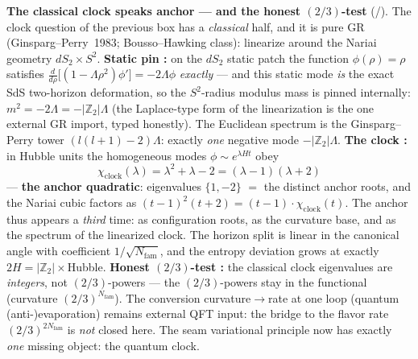 \documentclass[11pt,a4paper]{article}
\newcommand{\Z}{\mathbb{Z}}
\newcommand{\Nfam}{N_{\mathrm{fam}}}
\begin{document}
\par\smallskip\noindent\textbf{The classical clock speaks anchor --- and the honest $(2/3)$-test} (\mE/\mC).
The clock question of the previous box has a \emph{classical} half, and it is pure GR
(Ginsparg--Perry~1983; Bousso--Hawking class): linearize around the Nariai geometry
$dS_2\times S^2$. \textbf{Static pin \mE:} on the $dS_2$ static patch the function $\phi(\rho)=\rho$
satisfies $\frac{d}{d\rho}\bigl[(1-\Lambda\rho^2)\phi'\bigr]=-2\Lambda\phi$ \emph{exactly} --- and this
static mode \emph{is} the exact SdS two-horizon deformation, so the $S^2$-radius modulus mass is pinned
internally: $m^2=-2\Lambda=-|\Z_2|\Lambda$ (the Laplace-type form of the linearization is the one
external GR import, typed honestly). The Euclidean spectrum is the Ginsparg--Perry tower
$(l(l+1)-2)\Lambda$: exactly \emph{one} negative mode $-|\Z_2|\Lambda$. \textbf{The clock \mE:} in
Hubble units the homogeneous modes $\phi\sim e^{\lambda Ht}$ obey
\[
  \boxed{\ \chi_{\mathrm{clock}}(\lambda)=\lambda^2+\lambda-2=(\lambda-1)(\lambda+2)\ }
\]
--- \textbf{the anchor quadratic}: eigenvalues $\{1,-2\}$ $=$ the distinct anchor roots, and the Nariai
cubic factors as $(t-1)^2(t+2)=(t-1)\cdot\chi_{\mathrm{clock}}(t)$. The anchor thus appears a
\emph{third} time: as configuration roots, as the curvature base, and as the spectrum of the linearized
clock. The horizon split is linear in the canonical angle with coefficient $1/\sqrt{\Nfam}$, and the
entropy deviation grows at exactly $2H=|\Z_2|\times$Hubble. \textbf{Honest $(2/3)$-test \mC:} the
classical clock eigenvalues are \emph{integers}, not $(2/3)$-powers --- the $(2/3)$-powers stay in the
functional (curvature $(2/3)^{\Nfam}$). The conversion curvature$\to$rate at one loop (quantum
(anti-)evaporation) remains external QFT input: the bridge to the flavor rate $(2/3)^{2\Nfam}$ is
\emph{not} closed here. The seam variational principle now has exactly \emph{one} missing object: the
quantum clock. 
\end{document}
